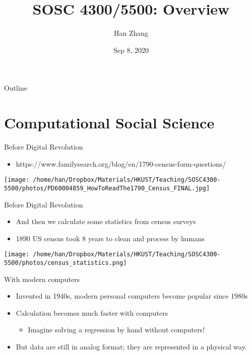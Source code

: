 \documentclass[handout]{beamer}
\author{Han Zhang}
\date{Sep 8, 2020}
\title{SOSC 4300/5500: Overview}
\begin{document}
\maketitle
\begin{frame}{Outline}
\tableofcontents
\end{frame}


\section{Computational Social Science}
\label{h:2db2563a-f2d1-43d5-9802-f8de3f82863c}
\begin{frame}[label={h:0eb7ed81-15c7-408d-be2a-112418fd2fb6}]{Before Digital Revolution}
\begin{itemize}
\item \small{https://www.familysearch.org/blog/en/1790-census-form-questions/}
\end{itemize}
\begin{center}
\texttt{[image: /home/han/Dropbox/Materials/HKUST/Teaching/SOSC4300-5500/photos/PD60004859\_HowToReadThe1790\_Census\_FINAL.jpg]}
\end{center}
\end{frame}

\begin{frame}[label={h:04e745da-c244-4d88-9bc6-23cdb92eae78}]{Before Digital Revolution}
\begin{itemize}
\item And then we calculate some statistics from census surveys
\item 1890 US census took \alert{8 years} to clean and process by humans
\end{itemize}
\begin{center}
\texttt{[image: /home/han/Dropbox/Materials/HKUST/Teaching/SOSC4300-5500/photos/census\_statistics.png]}
\end{center}
\end{frame}

\begin{frame}[label={h:3e0d46ea-646e-4c4a-8196-64817b5d805f}]{With modern computers}
\begin{itemize}
\item Invented in 1940s, modern personal computers become popular since 1980s
\item Calculation becomes much faster with computers
\begin{itemize}
\item Imagine solving a regression by hand without computers!
\end{itemize}
\item But data are still in analog format; they are represented in a physical way.
\end{itemize}
\end{frame}
\end{document}
